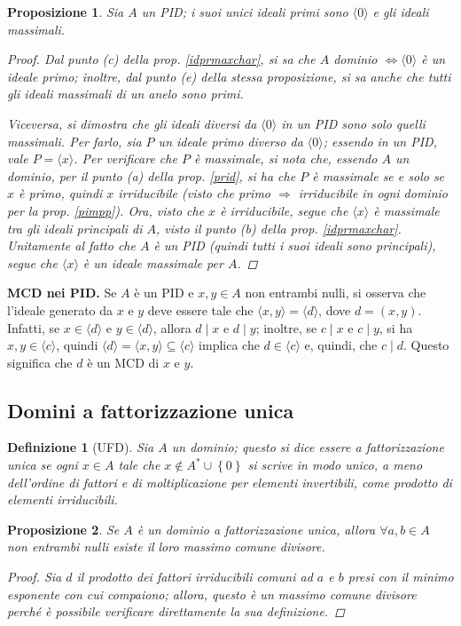 \documentclass[12pt]{scrartcl}
\theoremstyle{style}
\newtheorem{definizione}{Definizione}[section]
\newtheorem{prop}{Proposizione}[section]
\numberwithin{equation}{subsection}
\begin{document}
\begin{prop}\label{pideals}
	Sia $A$ un PID; i suoi unici ideali primi sono $\langle 0 \rangle$ e gli ideali massimali.
	\begin{proof}
		Dal punto (c) della prop. \ref{idprmaxchar}, si sa che $A$ dominio $\iff \langle 0 \rangle$ \`e un ideale primo; inoltre, dal punto (e) della stessa proposizione, si sa anche che tutti gli ideali massimali di un anelo sono primi.

		Viceversa, si dimostra che gli ideali diversi da $\langle 0 \rangle $ in un PID sono solo quelli massimali.
		Per farlo, sia $P$ un ideale primo diverso da $\langle 0 \rangle$; essendo  in un PID, vale $P=\langle x \rangle$.
		Per verificare che $P$ \`e massimale, si nota che, essendo $A$ un dominio, per il punto (a) della prop. \ref{prid}, si ha che $P$ \`e massimale se e solo se $x$ \`e primo, quindi $x$ irriducibile (visto che primo $\Rightarrow $ irriducibile in ogni dominio per la prop. \ref{pimpp}).
		Ora, visto che $x$ \`e irriducibile, segue che $\langle x \rangle$ \`e massimale tra gli ideali principali di $A$, visto il punto (b) della prop. \ref{idprmaxchar}.
		Unitamente al fatto che $A$ \`e un PID (quindi tutti i suoi ideali sono principali), segue che $\langle x \rangle$ \`e un ideale massimale per $A$.
	\end{proof}
\end{prop}

\textbf{MCD nei PID.} Se $A$ \`e un PID e $x,y \in A$ non entrambi nulli, si osserva che l'ideale generato da $x$ e $y$ deve essere tale che $\langle x,y \rangle=\langle d \rangle$, dove $d = (x,y)$.
Infatti, se $x \in \langle d \rangle$ e $y \in \langle d \rangle$, allora $d  \mid x $ e $d \mid y$; inoltre, se $c  \mid x $ e $c \mid y$, si ha $x,y \in \langle c \rangle$, quindi $\langle d \rangle=\langle x,y \rangle \subseteq \langle c \rangle$ implica che $d \in \langle c \rangle$ e, quindi, che $c \mid d$.
Questo significa che $d$ \`e un MCD di $x$ e $y$.

\subsection{Domini a fattorizzazione unica}
\begin{definizione}
	[UFD]
	Sia $A$ un dominio; questo si dice essere \textit{a fattorizzazione unica} se ogni $ x \in A$ tale che $x\not\in A^* \cup \left\{ 0 \right\} $ si scrive in modo unico, a meno dell'ordine di fattori e di moltiplicazione per elementi invertibili, come prodotto di elementi irriducibili.
\end{definizione}
\begin{prop}
	Se $A$ \`e un dominio a fattorizzazione unica, allora $\forall a,b \in A$ non entrambi nulli esiste il loro massimo comune divisore.
	\begin{proof}
		Sia $d$ il prodotto dei fattori irriducibili comuni ad $a$ e $b$ presi con il minimo esponente con cui compaiono; allora, questo \`e un massimo comune divisore perch\'e \`e possibile verificare direttamente la sua definizione.
	\end{proof}
\end{prop}
\end{document}

